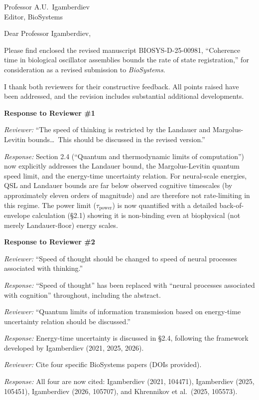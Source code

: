 \documentclass[12pt]{letter}
\begin{document}
\begin{letter}{Professor A.U.\ Igamberdiev\\Editor, BioSystems}

\opening{Dear Professor Igamberdiev,}

Please find enclosed the revised manuscript BIOSYS-D-25-00981, ``Coherence time in biological oscillator assemblies bounds the rate of state registration,'' for consideration as a revised submission to \textit{BioSystems}.

I thank both reviewers for their constructive feedback. All points raised have been addressed, and the revision includes substantial additional developments.

\medskip
\textbf{Response to Reviewer \#1}

\medskip
\textit{Reviewer:} ``The speed of thinking is restricted by the Landauer and Margolus-Levitin bounds\ldots\ This should be discussed in the revised version.''

\textit{Response:} Section 2.4 (``Quantum and thermodynamic limits of computation'') now explicitly addresses the Landauer bound, the Margolus-Levitin quantum speed limit, and the energy-time uncertainty relation. For neural-scale energies, QSL and Landauer bounds are far below observed cognitive timescales (by approximately eleven orders of magnitude) and are therefore not rate-limiting in this regime. The power limit ($\tau_{\mathrm{power}}$) is now quantified with a detailed back-of-envelope calculation (\S2.1) showing it is non-binding even at biophysical (not merely Landauer-floor) energy scales.

\medskip
\textbf{Response to Reviewer \#2}

\medskip
\textit{Reviewer:} ``Speed of thought should be changed to speed of neural processes associated with thinking.''

\textit{Response:} ``Speed of thought'' has been replaced with ``neural processes associated with cognition'' throughout, including the abstract.

\medskip
\textit{Reviewer:} ``Quantum limits of information transmission based on energy-time uncertainty relation should be discussed.''

\textit{Response:} Energy-time uncertainty is discussed in \S2.4, following the framework developed by Igamberdiev (2021, 2025, 2026).

\medskip
\textit{Reviewer:} Cite four specific BioSystems papers (DOIs provided).

\textit{Response:} All four are now cited: Igamberdiev (2021, 104471), Igamberdiev (2025, 105451), Igamberdiev (2026, 105707), and Khrennikov et al.\ (2025, 105573).


\end{letter}
\end{document}
